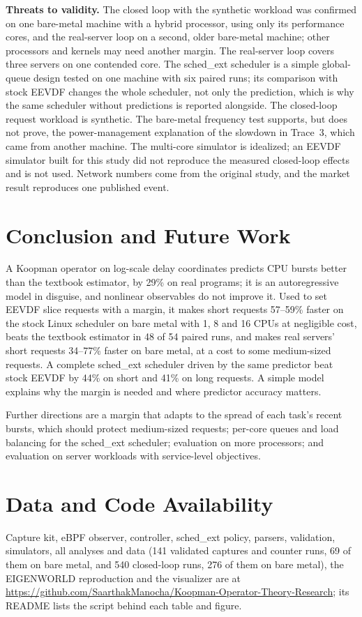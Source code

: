 \documentclass[conference,onecolumn,11pt]{IEEEtran}
\begin{document}
\textbf{Threats to validity.} The closed loop with the synthetic workload was confirmed on one bare-metal machine with a hybrid processor, using only its performance cores, and the real-server loop on a second, older bare-metal machine; other processors and kernels may need another margin. The real-server loop covers three servers on one contended core. The sched\_ext scheduler is a simple global-queue design tested on one machine with six paired runs; its comparison with stock EEVDF changes the whole scheduler, not only the prediction, which is why the same scheduler without predictions is reported alongside. The closed-loop request workload is synthetic. The bare-metal frequency test supports, but does not prove, the power-management explanation of the slowdown in Trace~3, which came from another machine. The multi-core simulator is idealized; an EEVDF simulator built for this study did not reproduce the measured closed-loop effects and is not used. Network numbers come from the original study, and the market result reproduces one published event.

\section{Conclusion and Future Work}
A Koopman operator on log-scale delay coordinates predicts CPU bursts better than the textbook estimator, by 29\% on real programs; it is an autoregressive model in disguise, and nonlinear observables do not improve it. Used to set EEVDF slice requests with a margin, it makes short requests 57--59\% faster on the stock Linux scheduler on bare metal with 1, 8 and 16 CPUs at negligible cost, beats the textbook estimator in 48 of 54 paired runs, and makes real servers' short requests 34--77\% faster on bare metal, at a cost to some medium-sized requests. A complete sched\_ext scheduler driven by the same predictor beat stock EEVDF by 44\% on short and 41\% on long requests. A simple model explains why the margin is needed and where predictor accuracy matters.

Further directions are a margin that adapts to the spread of each task's recent bursts, which should protect medium-sized requests; per-core queues and load balancing for the sched\_ext scheduler; evaluation on more processors; and evaluation on server workloads with service-level objectives.

\section*{Data and Code Availability}
Capture kit, eBPF observer, controller, sched\_ext policy, parsers, validation, simulators, all analyses and data (141 validated captures and counter runs, 69 of them on bare metal, and 540 closed-loop runs, 276 of them on bare metal), the EIGENWORLD reproduction and the visualizer are at \url{https://github.com/SaarthakManocha/Koopman-Operator-Theory-Research}; its README lists the script behind each table and figure.



\end{document}
